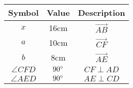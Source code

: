 \begin{tabular}{|c|c|c|}
\hline
Symbol & Value & Description\\
\hline
$x$ & 16cm & $\vec{AB}$ \\
\hline
$a$ & 10cm & $\vec{CF}$ \\
\hline
$b$ & 8cm & $\vec{AE}$ \\
\hline
$\angle{CFD}$ & $90\degree$ & $CF \perp AD$ \\
\hline
$\angle{AED}$ & $90\degree$ & $AE \perp CD$ \\
\hline
\end{tabular}

